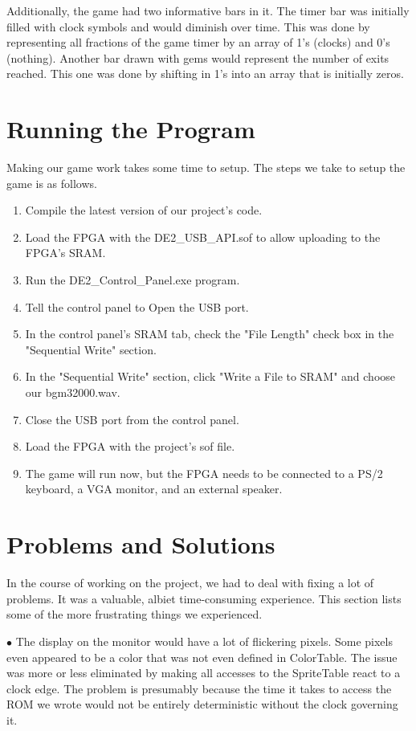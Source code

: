 \documentclass[10pt,a4paper]{article}
\begin{document}
Additionally, the game had two informative bars in it. The timer bar was initially filled with clock symbols and would diminish over time. This was done by representing all fractions of the game timer by an array of 1's (clocks) and 0's (nothing). Another bar drawn with gems would represent the number of exits reached. This one was done by shifting in 1's into an array that is initially zeros.

\section{Running the Program}
Making our game work takes some time to setup. The steps we take to setup the game is as follows.
\begin{enumerate}
\item Compile the latest version of our project's code.
\item Load the FPGA with the DE2\_USB\_API.sof to allow uploading to the FPGA's SRAM.
\item Run the DE2\_Control\_Panel.exe program.
\item Tell the control panel to Open the USB port.
\item In the control panel's SRAM tab, check the "File Length" check box in the "Sequential Write" section.
\item In the "Sequential Write" section, click "Write a File to SRAM" and choose our bgm32000.wav.
\item Close the USB port from the control panel.
\item Load the FPGA with the project's sof file.
\item The game will run now, but the FPGA needs to be connected to a PS/2 keyboard, a VGA monitor, and an external speaker.
\end{enumerate}

\section{Problems and Solutions}
In the course of working on the project, we had to deal with fixing a lot of problems. It was a valuable, albiet time-consuming experience. This section lists some of the more frustrating things we experienced.

$ \bullet $ The display on the monitor would have a lot of flickering pixels. Some pixels even appeared to be a color that was not even defined in ColorTable. The issue was more or less eliminated by making all accesses to the SpriteTable react to a clock edge. The problem is presumably because the time it takes to access the ROM we wrote would not be entirely deterministic without the clock governing it.
\end{document}
